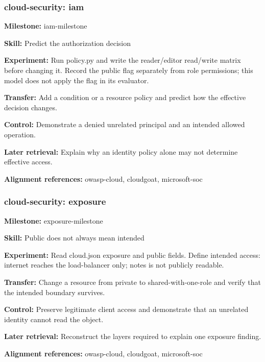 \subsubsection{cloud-security: iam}
\noindent\textbf{Milestone:} iam-milestone\par
\noindent\textbf{Skill:} Predict the authorization decision\par
\noindent\textbf{Experiment:} Run policy.py and write the reader/editor read/write matrix before changing it. Record the public flag separately from role permissions; this model does not apply the flag in its evaluator.\par
\noindent\textbf{Transfer:} Add a condition or a resource policy and predict how the effective decision changes.\par
\noindent\textbf{Control:} Demonstrate a denied unrelated principal and an intended allowed operation.\par
\noindent\textbf{Later retrieval:} Explain why an identity policy alone may not determine effective access.\par
\noindent\textbf{Alignment references:} owasp-cloud, cloudgoat, microsoft-soc\par
\subsubsection{cloud-security: exposure}
\noindent\textbf{Milestone:} exposure-milestone\par
\noindent\textbf{Skill:} Public does not always mean intended\par
\noindent\textbf{Experiment:} Read cloud.json exposure and public fields. Define intended access: internet reaches the load-balancer only; notes is not publicly readable.\par
\noindent\textbf{Transfer:} Change a resource from private to shared-with-one-role and verify that the intended boundary survives.\par
\noindent\textbf{Control:} Preserve legitimate client access and demonstrate that an unrelated identity cannot read the object.\par
\noindent\textbf{Later retrieval:} Reconstruct the layers required to explain one exposure finding.\par
\noindent\textbf{Alignment references:} owasp-cloud, cloudgoat, microsoft-soc\par
